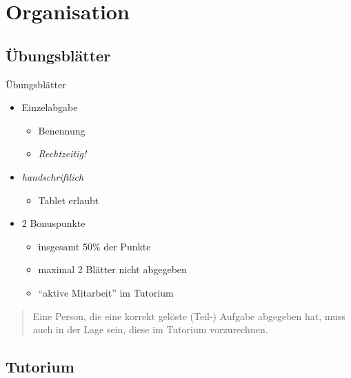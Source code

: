 \documentclass[aspectratio=169,usepdftitle=true,11pt,ngerman,t]{beamer}
\begin{document}
\section*{Organisation}

\subsection{Übungsblätter}

\begin{frame}{Übungsblätter}\onslide<+->
    \begin{itemize}[<+->]
        \item Einzelabgabe
        \begin{itemize}
            \item Benennung
            \item \emph{Rechtzeitig!}
        \end{itemize}
        \item \emph{handschriftlich}
        \begin{itemize}
            \item Tablet erlaubt
        \end{itemize}
        \item 2 Bonuspunkte
        \begin{itemize}
            \item insgesamt 50\% der Punkte
            \item maximal 2 Blätter nicht abgegeben
            \item \enquote{aktive Mitarbeit} im Tutorium
        \end{itemize}
    \end{itemize}
    \vspace{1em}\onslide<+->
    \begin{quotation}
        Eine Person, die eine korrekt gelöste (Teil-) Aufgabe abgegeben hat, muss auch in der Lage sein, diese im Tutorium vorzurechnen.
    \end{quotation}
\end{frame}

\subsection{Tutorium}
\end{document}
